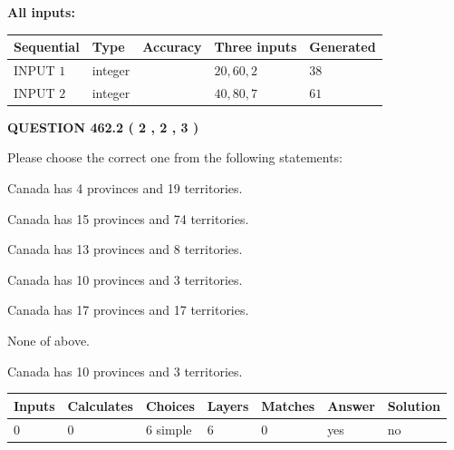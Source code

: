 \documentclass[12pt]{article}
\begin{document}
   
   
   
\noindent\vspace{0.1in}\hspace{-0.08in} {\textbf{\Large{All inputs: }}}
   
   
  
  
\noindent\begin{tabular}{|l|l|l|l|l|}
\hline
 Sequential & Type & Accuracy & Three inputs & Generated \\ 
\hline
 
 
  INPUT $  1 $ & integer &  & $
 20
 , 
 60
 , 
 2
 $ & $ 38 $ 
 \\  \hline  
 
 
  INPUT $  2 $ & integer &  & $
 40
 , 
 80
 , 
 7
 $ & $ 61 $ 
 \\  \hline  
 \end{tabular}
   
   
  
\vspace{0.2in}
  
{\textbf{\Large{QUESTION
462.2 
 ( 2 , 2 , 3 )
}}}
  
  
Please choose the correct one from the following statements:
 
 
Canada has   4 provinces and  19 territories.
 
 
Canada has  15 provinces and  74 territories.
 
 
Canada has  13 provinces and  8 territories.
 
 
Canada has 10  provinces and 3 territories.
 
 
Canada has  17 provinces and  17 territories.
 
 
 None of above.
 
 
\noindent{}
 
 
Canada has 10  provinces and 3 territories.
 
 
\noindent{}
 
 
   
   
   
   
\noindent\begin{tabular}{|l|l|l|l|l|l|l|}
 \hline
Inputs & Calculates & Choices & Layers & Matches & Answer & Solution \\ \hline
 0  & 
 0  & 
 6
  simple  
  & 
 6  & 
 0  & 
  yes & 
  no 
  \\ \hline
 \end{tabular}
   
\end{document}
